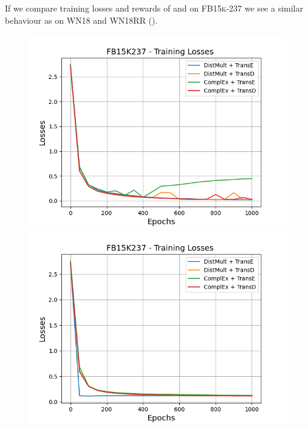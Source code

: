 If we compare training losses and rewards of \usmax and \usmax on \textsc{FB15k-237} we see a similar behaviour as on \textsc{WN18} and \textsc{WN18RR} ().
\begin{figure}
    \centering
    \begin{minipage}{.5\textwidth}
      \centering
      \includegraphics[width=0.9\linewidth]{figures/results/gan_train/not_pretrained/uncertainty/max/entropy/fb15k237/uncertainty_fb15k237_losses.png}
    \end{minipage}%
    \begin{minipage}{.5\textwidth}
      \centering
      \includegraphics[width=0.9\linewidth]{figures/results/gan_train/not_pretrained/uncertainty/max_distribution/entropy/fb15k237/uncertainty_fb15k237_losses.png}
    \end{minipage}

\end{figure}
